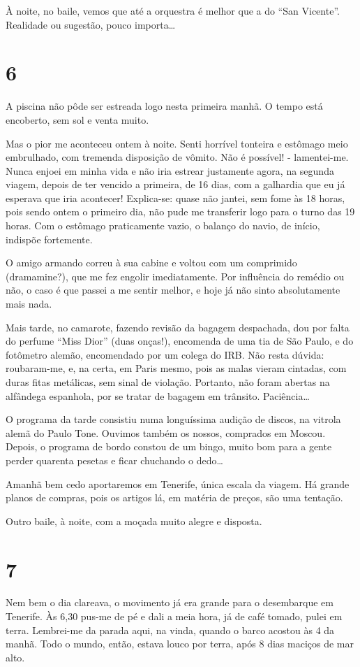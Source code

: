 À noite, no baile, vemos que até a orquestra é melhor que a do “San Vicente”. Realidade ou sugestão, pouco importa\ldots

\section*{6 \adfflatleafright {}}
A piscina não pôde ser estreada logo nesta primeira manhã. O tempo está encoberto, sem sol e venta muito.

Mas o pior me aconteceu ontem à noite. Senti horrível tonteira e estômago meio embrulhado, com tremenda disposição de vômito. Não é possível! - lamentei-me. Nunca enjoei em minha vida e não iria estrear justamente agora, na segunda viagem, depois de ter vencido a primeira, de 16 dias, com a galhardia que eu já esperava que iria acontecer! Explica-se: quase não jantei, sem fome às 18 horas, pois sendo ontem o primeiro dia, não pude me transferir logo para o turno das 19 horas. Com o estômago praticamente vazio, o balanço do navio, de início, indispõe fortemente.

O amigo armando correu à sua cabine e voltou com um comprimido (dramamine?), que me fez engolir imediatamente. Por influência do remédio ou não, o caso é que passei a me sentir melhor, e hoje já não sinto absolutamente mais nada.

Mais tarde, no camarote, fazendo revisão da bagagem despachada, dou por falta do perfume “Miss Dior” (duas onças!), encomenda de uma tia de São Paulo, e do fotômetro alemão, encomendado por um colega do IRB. Não resta dúvida: roubaram-me, e, na certa, em Paris mesmo, pois as malas vieram cintadas, com duras fitas metálicas, sem sinal de violação. Portanto, não foram abertas na alfândega espanhola, por se tratar de bagagem em trânsito. Paciência\ldots

O programa da tarde consistiu numa longuíssima audição de discos, na vitrola alemã do Paulo Tone. Ouvimos também os nossos, comprados em Moscou. Depois, o programa de bordo constou de um bingo, muito bom para a gente perder quarenta pesetas e ficar chuchando o dedo\ldots

Amanhã bem cedo aportaremos em Tenerife, única escala da viagem. Há grande planos de compras, pois os artigos lá, em matéria de preços, são uma tentação.

Outro baile, à noite, com a moçada muito alegre e disposta.

\section*{7 \adfflatleafright {}}
Nem bem o dia clareava, o movimento já era grande para o desembarque em Tenerife. Às 6,30 pus-me de pé e dali a meia hora, já de café tomado, pulei em terra. Lembrei-me da parada aqui, na vinda, quando o barco acostou às 4 da manhã. Todo o mundo, então, estava louco por terra, após 8 dias maciços de mar alto.

